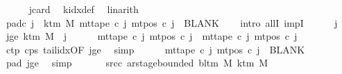 \begin{isabellebody}
\ \ \ \ \isamarkupfalse%
\ jcard\ \isamarkupfalse%
\ k{\isacharunderscore}{\kern0pt}idx{\isacharunderscore}{\kern0pt}def\ \isamarkupfalse%
\ linarith\isanewline
\ \ \isamarkupfalse%
\ pad{\isacharunderscore}{\kern0pt}c{\isacharcolon}{\kern0pt}\ {\isachardoublequoteopen}{\isasymforall}j{\isacharprime}{\kern0pt}\ {\isasymge}\ k{\isacharunderscore}{\kern0pt}tm\ M{\isachardot}{\kern0pt}\ mt{\isacharunderscore}{\kern0pt}tape\ c\ j{\isacharprime}{\kern0pt}\ {\isacharparenleft}{\kern0pt}mt{\isacharunderscore}{\kern0pt}pos\ c\ j{\isacharprime}{\kern0pt}{\isacharparenright}{\kern0pt}\ {\isacharequal}{\kern0pt}\ BLANK{}{\isachardoublequoteclose}\isanewline
\ \ \isamarkupfalse%
\ {\isacharparenleft}{\kern0pt}intro\ allI\ impI{\isacharparenright}{\kern0pt}\isanewline
\ \ \ \ \isamarkupfalse%
\ j{\isacharprime}{\kern0pt}\ \isamarkupfalse%
\ jge{\isacharcolon}{\kern0pt}\ {\isachardoublequoteopen}k{\isacharunderscore}{\kern0pt}tm\ M\ {\isasymle}\ j{\isacharprime}{\kern0pt}{\isachardoublequoteclose}\isanewline
\ \ \ \ \isamarkupfalse%
\ {\isachardoublequoteopen}mt{\isacharunderscore}{\kern0pt}tape\ c\ j{\isacharprime}{\kern0pt}\ {\isacharparenleft}{\kern0pt}mt{\isacharunderscore}{\kern0pt}pos\ c\ j{\isacharprime}{\kern0pt}{\isacharparenright}{\kern0pt}\ {\isacharequal}{\kern0pt}\ mt{\isacharunderscore}{\kern0pt}tape\ c{}\ j{\isacharprime}{\kern0pt}\ {\isacharparenleft}{\kern0pt}mt{\isacharunderscore}{\kern0pt}pos\ c{}\ j{\isacharprime}{\kern0pt}{\isacharparenright}{\kern0pt}{\isachardoublequoteclose}\isanewline
\ \ \ \ \ \ \isamarkupfalse%
\ c{\isacharunderscore}{\kern0pt}tp\ c{\isacharunderscore}{\kern0pt}ps\ tail{\isacharunderscore}{\kern0pt}idx{\isacharbrackleft}{\kern0pt}OF\ jge{\isacharbrackright}{\kern0pt}\ \isamarkupfalse%
\ simp\isanewline
\ \ \ \ \isamarkupfalse%
\ {\isachardoublequoteopen}mt{\isacharunderscore}{\kern0pt}tape\ c\ j{\isacharprime}{\kern0pt}\ {\isacharparenleft}{\kern0pt}mt{\isacharunderscore}{\kern0pt}pos\ c\ j{\isacharprime}{\kern0pt}{\isacharparenright}{\kern0pt}\ {\isacharequal}{\kern0pt}\ BLANK{}{\isachardoublequoteclose}\ \isamarkupfalse%
\ pad{}\ jge\ \isamarkupfalse%
\ simp\isanewline
\ \ \isamarkupfalse%
\isanewline
\ \ \isamarkupfalse%
\ src{\isacharunderscore}{\kern0pt}c{\isacharcolon}{\kern0pt}\ {\isachardoublequoteopen}ar{\isacharunderscore}{\kern0pt}stage{\isacharunderscore}{\kern0pt}bounded\ {\isacharparenleft}{\kern0pt}bl{\isacharunderscore}{\kern0pt}tm\ M{\isacharparenright}{\kern0pt}\ {\isacharparenleft}{\kern0pt}k{\isacharunderscore}{\kern0pt}tm\ M{\isacharparenright}{\kern0pt}\isanewline

\end{isabellebody}
